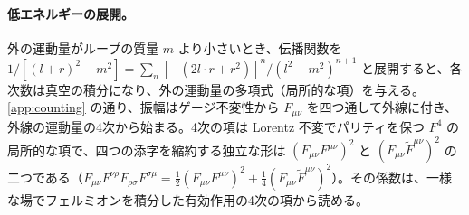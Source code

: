 \documentclass[a4paper,10pt]{ltjsarticle}
\begin{document}
\paragraph{低エネルギーの展開。}外の運動量がループの質量 $m$ より小さいとき、伝播関数を $1/[(l+r)^2-m^2]=\sum_n[-(2l\cdot r+r^2)]^n/(l^2-m^2)^{n+1}$ と展開すると、各次数は真空の積分になり、外の運動量の多項式（局所的な項）を与える。\ref{app:counting} の通り、振幅はゲージ不変性から $F_{\mu\nu}$ を四つ通して外線に付き、外線の運動量の4次から始まる。4次の項は Lorentz 不変でパリティを保つ $F^4$ の局所的な項で、四つの添字を縮約する独立な形は $(F_{\mu\nu}F^{\mu\nu})^2$ と $(F_{\mu\nu}\tilde F^{\mu\nu})^2$ の二つである（$F_{\mu\nu}F^{\nu\rho}F_{\rho\sigma}F^{\sigma\mu}=\frac12(F_{\mu\nu}F^{\mu\nu})^2+\frac14(F_{\mu\nu}\tilde F^{\mu\nu})^2$）。その係数は、一様な場でフェルミオンを積分した有効作用の4次の項から読める。
\end{document}
